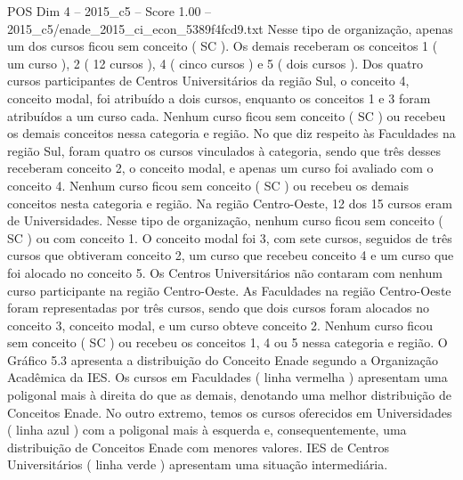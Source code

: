 \begin{textsample}{POS Dim 4 – 2015\_c5 – Score 1.00 – 2015\_c5/enade\_2015\_ci\_econ\_5389f4fcd9.txt}
Nesse tipo de organização, apenas um dos cursos ficou sem conceito ( SC ).
Os demais receberam os conceitos 1 ( um curso ), 2 ( 12 cursos ), 4 ( cinco cursos ) e 5 ( dois cursos ).
Dos quatro cursos participantes de Centros Universitários da região Sul, o conceito 4, conceito modal, foi atribuído a dois cursos, enquanto os conceitos 1 e 3 foram atribuídos a um curso cada.
Nenhum curso ficou sem conceito ( SC ) ou recebeu os demais conceitos nessa categoria e região.
No que diz respeito às Faculdades na região Sul, foram quatro os cursos vinculados à categoria, sendo que três desses receberam conceito 2, o conceito modal, e apenas um curso foi avaliado com o conceito 4.
Nenhum curso ficou sem conceito ( SC ) ou recebeu os demais conceitos nesta categoria e região.
Na região Centro-Oeste, 12 dos 15 cursos eram de Universidades.
Nesse tipo de organização, nenhum curso ficou sem conceito ( SC ) ou com conceito 1.
O conceito modal foi 3, com sete cursos, seguidos de três cursos que obtiveram conceito 2, um curso que recebeu conceito 4 e um curso que foi alocado no conceito 5.
Os Centros Universitários não contaram com nenhum curso participante na região Centro-Oeste.
As Faculdades na região Centro-Oeste foram representadas por três cursos, sendo que dois cursos foram alocados no conceito 3, conceito modal, e um curso obteve conceito 2.
Nenhum curso ficou sem conceito ( SC ) ou recebeu os conceitos 1, 4 ou 5 nessa categoria e região.
O Gráfico 5.3 apresenta a distribuição do Conceito Enade segundo a Organização Acadêmica da IES.
Os cursos em Faculdades ( linha vermelha ) apresentam uma poligonal mais à direita do que as demais, denotando uma melhor distribuição de Conceitos Enade.
No outro extremo, temos os cursos oferecidos em Universidades ( linha azul ) com a poligonal mais à esquerda e, consequentemente, uma distribuição de Conceitos Enade com menores valores.
IES de Centros Universitários ( linha verde ) apresentam uma situação intermediária.

\end{textsample}

